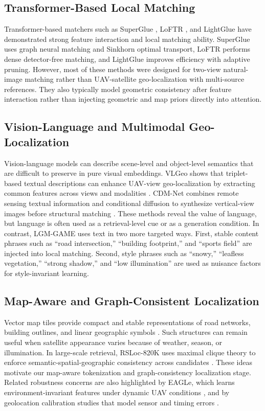 \documentclass[journal]{IEEEtran}
\begin{document}
\subsection{Transformer-Based Local Matching}
Transformer-based matchers such as SuperGlue \cite{superglue2020}, LoFTR \cite{loftr2021}, and LightGlue \cite{lightglue2023} have demonstrated strong feature interaction and local matching ability. SuperGlue uses graph neural matching and Sinkhorn optimal transport, LoFTR performs dense detector-free matching, and LightGlue improves efficiency with adaptive pruning. However, most of these methods were designed for two-view natural-image matching rather than UAV-satellite geo-localization with multi-source references. They also typically model geometric consistency after feature interaction rather than injecting geometric and map priors directly into attention.

\subsection{Vision-Language and Multimodal Geo-Localization}
Vision-language models can describe scene-level and object-level semantics that are difficult to preserve in pure visual embeddings. VLGeo shows that triplet-based textual descriptions can enhance UAV-view geo-localization by extracting common features across views and modalities \cite{vlgeo2026}. CDM-Net combines remote sensing textual information and conditional diffusion to synthesize vertical-view images before structural matching \cite{cdmnet2025}. These methods reveal the value of language, but language is often used as a retrieval-level cue or as a generation condition. In contrast, LGM-GAME uses text in two more targeted ways. First, stable content phrases such as ``road intersection,'' ``building footprint,'' and ``sports field'' are injected into local matching. Second, style phrases such as ``snowy,'' ``leafless vegetation,'' ``strong shadow,'' and ``low illumination'' are used as nuisance factors for style-invariant learning.

\subsection{Map-Aware and Graph-Consistent Localization}
Vector map tiles provide compact and stable representations of road networks, building outlines, and linear geographic symbols \cite{vectormap2025}. Such structures can remain useful when satellite appearance varies because of weather, season, or illumination. In large-scale retrieval, RSLoc-820K uses maximal clique theory to enforce semantic-spatial-geographic consistency across candidates \cite{rsloc820k2025}. These ideas motivate our map-aware tokenization and graph-consistency localization stage. Related robustness concerns are also highlighted by EAGLe, which learns environment-invariant features under dynamic UAV conditions \cite{eagle2025}, and by geolocation calibration studies that model sensor and timing errors \cite{mersi2025}.
\end{document}
